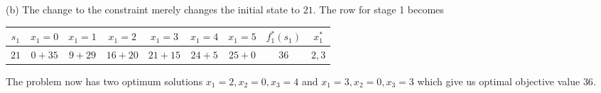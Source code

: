 \documentclass{article}[12pt,a4paper]
\begin{document}
\begin{enumerate}
  (b) The change to the constraint merely changes the initial state to $21$. The row for stage 1 becomes
  \begin{center}
  \begin{tabular}{c | c c c c c c | c | c}
  $s_1$ & $x_1 = 0$ & $x_1 = 1$ & $x_1 = 2$ & $x_1 = 3$ & $x_1 = 4$ & $x_1 = 5$ & $f_1^*(s_1)$ & $x_1^*$ \\
  \hline
  $21$ & $0 + 35$ & $9 + 29$ & $16 + 20$ & $21 + 15$ & $24 + 5$ & $25+ 0$ & $36$ & $2, 3$
  \end{tabular}
  \end{center}
  The problem now has two optimum solutions $x_1 = 2, x_2 = 0, x_3 = 4$ and $x_1 = 3, x_2 = 0, x_3 = 3$
  which give us optimal objective value $36$.
  
  \end{enumerate}
\end{document}
